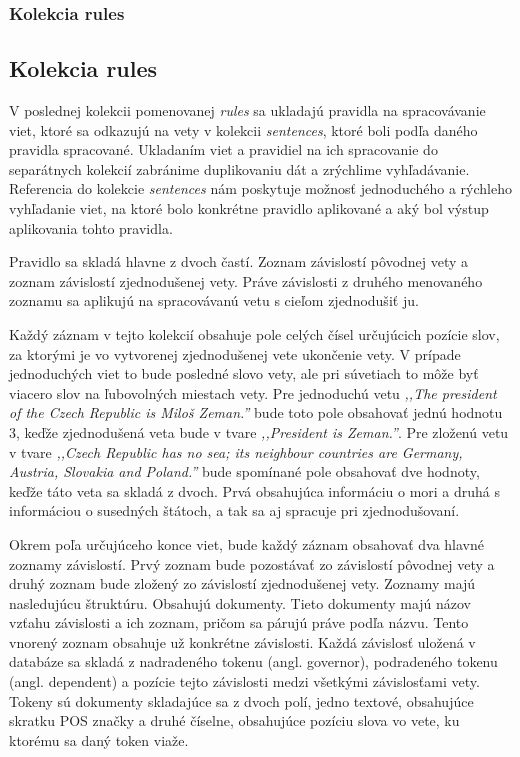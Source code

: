 %
%
{
	\subsubsection{Kolekcia rules}
}
{
	\subsection{Kolekcia rules}
}
V poslednej kolekcii pomenovanej \textit{rules} sa ukladajú pravidla na spracovávanie viet, ktoré sa odkazujú na vety v kolekcii \textit{sentences}, ktoré boli podľa daného pravidla spracované. Ukladaním viet a pravidiel na ich spracovanie do separátnych kolekcií zabránime duplikovaniu dát a zrýchlime vyhľadávanie. Referencia do kolekcie \textit{sentences} nám poskytuje možnosť jednoduchého a rýchleho vyhľadanie viet, na ktoré bolo konkrétne pravidlo aplikované a aký bol výstup aplikovania tohto pravidla.

Pravidlo sa skladá hlavne z dvoch častí. Zoznam závislostí pôvodnej vety a zoznam závislostí zjednodušenej vety. Práve závislosti z druhého menovaného zoznamu sa aplikujú na spracovávanú vetu s cieľom zjednodušiť ju.

Každý záznam v tejto kolekcií obsahuje pole celých čísel určujúcich pozície slov, za ktorými je vo vytvorenej zjednodušenej vete ukončenie vety. V prípade jednoduchých viet to bude posledné slovo vety, ale pri súvetiach to môže byť viacero slov na ľubovolných miestach vety. Pre jednoduchú vetu \textit{,,The president of the Czech Republic is Miloš Zeman.''} bude toto pole obsahovať jednú hodnotu 3, keďže zjednodušená veta bude v tvare \textit{,,President is Zeman.''}. Pre zloženú vetu v tvare \textit{,,Czech Republic has no sea; its neighbour countries are Germany, Austria, Slovakia and Poland.''} bude spomínané pole obsahovať dve hodnoty, keďže táto veta sa skladá z dvoch. Prvá obsahujúca informáciu o mori a druhá s informáciou o susedných štátoch, a tak sa aj spracuje pri zjednodušovaní.

Okrem poľa určujúceho konce viet, bude každý záznam obsahovať dva hlavné zoznamy závislostí. Prvý zoznam bude pozostávať zo závislostí pôvodnej vety a druhý zoznam bude zložený zo závislostí zjednodušenej vety. Zoznamy majú nasledujúcu štruktúru. Obsahujú dokumenty. Tieto dokumenty majú názov vzťahu závislosti a ich zoznam, pričom sa párujú práve podľa názvu. Tento vnorený zoznam obsahuje už konkrétne závislosti. Každá závislosť uložená v databáze sa skladá z nadradeného tokenu (angl. governor), podradeného tokenu (angl. dependent) a pozície tejto závislosti medzi všetkými závislosťami vety. Tokeny sú dokumenty skladajúce sa z dvoch polí, jedno textové, obsahujúce skratku POS značky a druhé číselne, obsahujúce pozíciu slova vo vete, ku ktorému sa daný token viaže.

